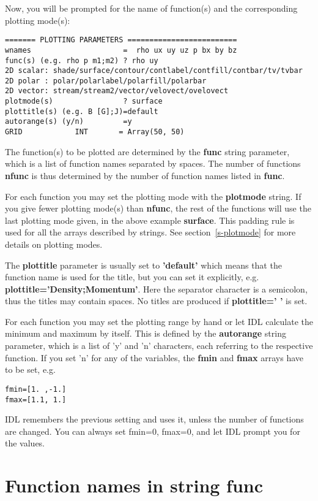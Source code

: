 \documentclass{article}
\begin{document}
   Now, you will be prompted 
   for the name of function(s) and the corresponding plotting mode(s):
\begin{verbatim}
======= PLOTTING PARAMETERS =========================
wnames                     =  rho ux uy uz p bx by bz
func(s) (e.g. rho p m1;m2) ? rho uy
2D scalar: shade/surface/contour/contlabel/contfill/contbar/tv/tvbar
2D polar : polar/polarlabel/polarfill/polarbar
2D vector: stream/stream2/vector/velovect/ovelovect
plotmode(s)                ? surface
plottitle(s) (e.g. B [G];J)=default
autorange(s) (y/n)         =y
GRID            INT       = Array(50, 50)
\end{verbatim}
   The function(s) to be plotted are determined by the {\bf func}
   string parameter, which is a list of function names separated by spaces.
   The number of functions {\bf nfunc} is thus determined by the number of
   function names listed in {\bf func}. 

   For each function you may set the plotting mode with the {\bf plotmode} string.
   If you give fewer plotting mode(s) than {\bf nfunc}, the rest of
   the functions will use the last plotting mode given, in the above example
   {\bf surface}. This padding rule is used for all the arrays described 
   by strings. See section~\ref{s-plotmode} for more details on plotting modes.

   The {\bf plottitle} parameter is usually set to {\bf 'default'} which
   means that the function name is used for the title, but you can set it
   explicitly, e.g. {\bf plottitle='Density;Momentum'}. Here the 
   separator character is a semicolon, thus the titles may contain spaces.
   No titles are produced if {\bf plottitle=' '} is set.

   For each function you may set the plotting range by hand or let IDL
   calculate the minimum and maximum by itself. This is defined by
   the {\bf autorange} string parameter, which is a list of 'y' and 'n'
   characters, each referring to the respective function. If you set 'n'
   for any of the variables, the {\bf fmin} and {\bf fmax} arrays have
   to be set, e.g.
\begin{verbatim}
fmin=[1. ,-1.]
fmax=[1.1, 1.]
\end{verbatim}
   IDL remembers the previous setting and uses it, unless the number
   of functions are changed. You can always set fmin=0, fmax=0, and let
   IDL prompt you for the values.

\section{Function names in string func \label{s-functions}}
\end{document}
